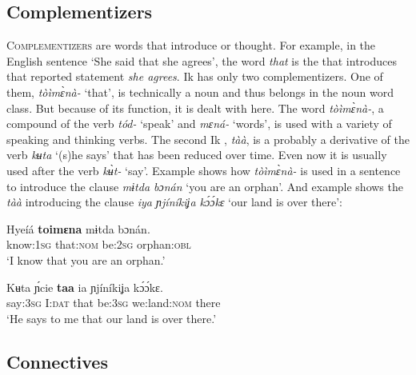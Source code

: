 \subsection{Complementizers}\label{sec:3.13}


\textsc{Complementizers} are words that introduce  or thought. For example, in the English sentence ‘She said that she agrees’, the word \textit{that} is the  that introduces that reported statement \textit{she agrees}. Ik has only two complementizers. One of them, \textit{tòìm\`{ɛ}nà-} ‘that’, is technically a noun and thus belongs in the noun word class. But because of its function, it is dealt with here. The word \textit{tòìm\`{ɛ}nà-}, a compound of the verb \textit{tód-} ‘speak’ and \textit{mɛná-} ‘words’, is used with a variety of speaking and thinking verbs. The second Ik , \textit{tàà}, is a probably a derivative of the verb \textit{kʉta} ‘(s)he says’ that has been reduced over time. Even now it is usually used after the verb \textit{k\`{ʉ}t-} ‘say’. Example  shows how \textit{tòìm\`{ɛ}nà-} is used in a sentence to introduce the clause \textit{mɨt{\Í}da bɔnán} ‘you are an orphan’. And example  shows the  \textit{tàà} introducing the clause \textit{iya ɲjíníkiʝa k\'{ɔ}\'{ɔ}kɛ} ‘our land is over there’:




\ea\label{ex:morph:9}
\gll Hyeíá   \textbf{toimɛna}   mɨt{\Í}da   bɔnán. \\
know:\textsc{1sg}   that:\textsc{nom}   be:\textsc{2sg}   orphan:\textsc{obl}    \\
\glt ‘I know that you are an orphan.’ 
\z




\ea\label{ex:morph:10}
\gll Kʉta   \'{ɲ}cie   \textbf{taa}   ia     ɲjíníkiʝa    k\'{ɔ}\'{ɔ}kɛ. \\
say:\textsc{3sg}   I:\textsc{dat}   that   be:\textsc{3sg}  we:land:\textsc{nom} there    \\
\glt ‘He says to me that our land is over there.’ 
\z






\subsection{Connectives}\label{sec:3.14}


